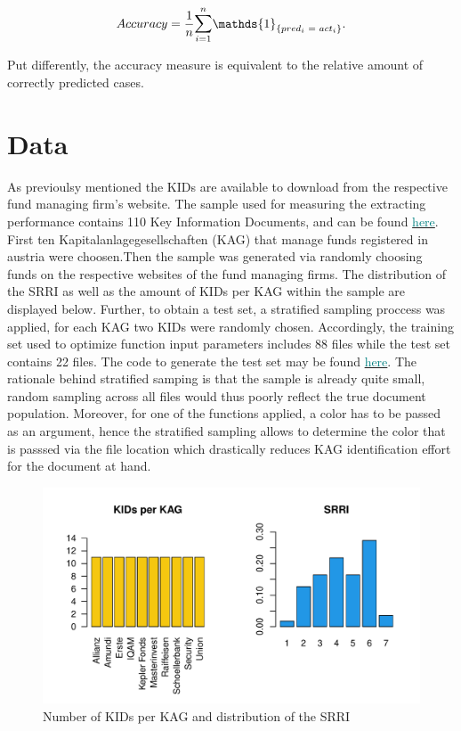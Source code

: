 \documentclass[aodsor,preprint]{imsart}
\numberwithin{equation}{section}
\theoremstyle{plain}
\begin{document}
\[
Accuracy = \frac{1}{n}\mathlarger{\sum}_{i = 1}^n\mathds{1}_{\{pred_i \text{ }= \text{ } act_i\}}\text{.}
\]

Put differently, the accuracy measure is equivalent to the relative amount of correctly predicted cases.
\newpage

\section{Data}
As previoulsy mentioned the KIDs are available to download from the respective fund managing firm's website. The  sample used for measuring the extracting performance contains 110 Key Information Documents, and can be found \href{https://github.com/Base-R-Best-R/KID/tree/main/KIDs}{\textcolor{teal}{here}}. First ten Kapitalanlagegesellschaften (KAG) that manage funds registered in austria were choosen.Then the sample was generated via randomly choosing funds on the respective websites of the fund managing firms. The distribution of the SRRI as well as the amount of KIDs per KAG within the sample are displayed below. Further, to obtain a test set, a stratified sampling proccess was applied, for each KAG two KIDs were randomly chosen. Accordingly, the training set used to optimize function input parameters includes 88 files while the test set contains 22 files. The code to generate the test set may be found \href{https://github.com/Base-R-Best-R/KID/blob/main/Code/Package/DEV/Generate_Test_Sample.R}{\textcolor{teal}{here}}. The rationale behind stratified samping is that the sample is already quite small, random sampling across all files would thus poorly reflect the true document population. Moreover, for one of the functions applied, a color has to be passed as an argument, hence the stratified sampling allows to determine the color that is passsed via the file location which drastically reduces KAG identification effort for the document at hand. 

\begin{figure}[H]
	\includegraphics[width = 12cm]{data_overview.pdf}
	\caption{Number of KIDs per KAG and distribution of the SRRI}
\end{figure}
\end{document}
